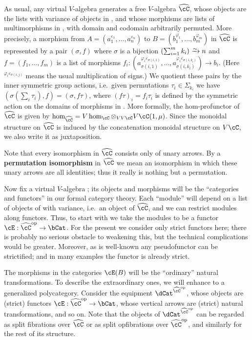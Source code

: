 \documentclass{amsart}
\newcommand{\C}{\cC}
\renewcommand{\Chat}{\ensuremath{\widehat{\C}}\xspace}
\newcommand{\E}{\cE}
\newcommand{\e}[1][]{^{\varepsilon_{#1}}}
\renewcommand{\ph}[1][]{^{\varphi_{#1}}}
\newcommand{\phe}[2]{^{\varphi_{#1}\varepsilon_{#2}}}
\begin{document}
As usual, any virtual $V$-algebra \C generates a free $V$-algebra \Chat, whose objects are the lists with variance of objects in \C, and whose morphisms are lists of multimorphisms in \C, with domain and codomain arbitrarily permuted.
More precisely, a morphism from $A=(a_1\e[1],\dots,a_n\e[n])$ to $B=(b_1\ph[1],\dots,b_m\ph[m])$ in \Chat is represented by a pair $(\sigma,f)$ where $\sigma$ is a bijection $\left(\sum_{i=1}^m k_i\right) \toiso n$ and $f=(f_1,\dots,f_m)$ is a list of morphisms $f_i:(a_{\sigma(i,1)}\phe{i}{\sigma(i,1)},\dots,a_{\sigma(i,k_i)}\phe{i}{\sigma(i,k_i)}) \to b_i$.
(Here $\phe{i}{\sigma(i,j)}$ means the usual multiplication of signs.)
We quotient these pairs by the inner symmetric group actions, i.e.\ given permutations $\tau_i\in\Sigma_{k_i}$ we have $(\sigma(\sum_i \tau_i), f) = (\sigma,f\tau)$, where $(f\tau)_i = f_i \tau_i$ is defined by the symmetric action on the domains of morphisms in \C.
More formally, the hom-profunctor of \Chat is given by $\hom_{\Chat} = V\hom_\C \otimes_{VV\C} V\C(1,\mu)$.
Since the monoidal structure on \Chat is induced by the concatenation monoidal structure on $V\C$, we also write it as juxtaposition.

Note that every isomorphism in \Chat consists only of unary arrows.
By a \textbf{permutation isomorphism} in \Chat we mean an isomorphism in which these unary arrows are all identities; thus it really is nothing but a permutation.

Now fix a virtual $V$-algebra \C; its objects and morphisms will be the ``categories and functors'' in our formal category theory.
Each ``module'' will depend on a list of objects of \C with variance, i.e.\ an object of \Chat, and we can restrict modules along functors.
Thus, to start with we take the modules to be a functor $\E:\Chat\op\to \bCat$.
For the present we consider only strict functors here; there is probably no serious obstacle to weakening this, but the technical complications would be greater.
Moreover, as is well-known any pseudofunctor can be strictified; and in many examples the functor is already strict.

The morphisms in the categories $\E(B)$ will be the ``ordinary'' natural transformations.
To describe the extraordinary ones, we will enhance \E to a generalized polycategory.
Consider the equipment $\dCat^{\Chat\op}$, whose objects are (strict) functors $\E:\Chat\op\to\bCat$, whose vertical arrows are (strict) natural transformations, and so on.
Note that the objects of $\dCat^{\Chat\op}$ can be regarded as split fibrations over $\Chat$ or as split opfibrations over $\Chat\op$, and similarly for the rest of its structure.
\end{document}
